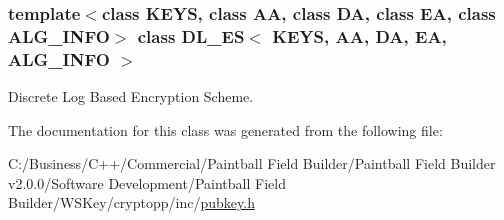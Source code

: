\subsubsection*{template$<$class KEYS, class AA, class DA, class EA, class ALG\_\-INFO$>$ class DL\_\-ES$<$ KEYS, AA, DA, EA, ALG\_\-INFO $>$}

Discrete Log Based Encryption Scheme. 

The documentation for this class was generated from the following file:\begin{DoxyCompactItemize}
\item 
C:/Business/C++/Commercial/Paintball Field Builder/Paintball Field Builder v2.0.0/Software Development/Paintball Field Builder/WSKey/cryptopp/inc/\hyperlink{pubkey_8h}{pubkey.h}\end{DoxyCompactItemize}
